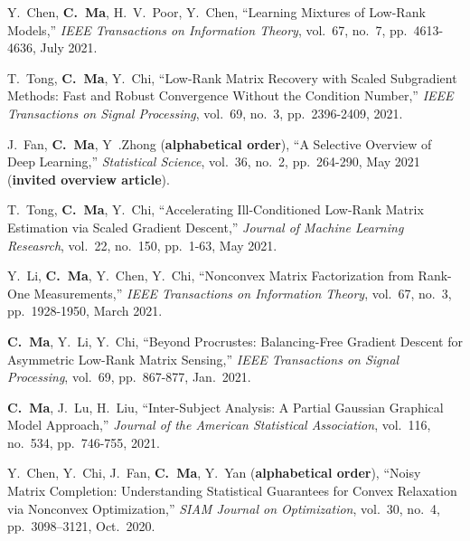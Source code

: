 \documentclass[a4paper, 10pt]{article}
\newenvironment{changemargin}[2]{%
  \begin{list}{}{%
    \setlength{\topsep}{0pt}%
    \setlength{\leftmargin}{#1}%
    \setlength{\rightmargin}{#2}%
    \setlength{\listparindent}{\parindent}%
    \setlength{\itemindent}{\parindent}%
    \setlength{\parsep}{\parskip}%
  }%
  \item[]}{\end{list}
}
\newenvironment{body} {
	\vspace*{-16pt}
	\begin{changemargin}{-0.3in}{-0.5in}
  }	
	{\end{changemargin}
}
\begin{document}
\begin{body}
\begin{enumerate}[label={[{J}{{\arabic*}}]}]
\item Y.~Chen, \textbf{C.~Ma}, H.~V.~Poor, Y.~Chen, {``Learning Mixtures of Low-Rank Models,''} \emph{IEEE Transactions on Information Theory}, vol.~67, no.~7, pp.~4613-4636, July 2021. \\






\item T.~Tong, \textbf{C.~Ma}, Y.~Chi, {``Low-Rank Matrix Recovery with Scaled Subgradient Methods: Fast and Robust Convergence Without the Condition Number,''}  \emph{IEEE Transactions on Signal Processing}, vol.~69, no.~3, pp.~2396-2409, 2021. \\







\item J.~Fan, \textbf{C.~Ma}, Y~.Zhong (\textbf{alphabetical order}), {``A Selective Overview of Deep Learning,''} \emph{Statistical Science}, vol.~36, no.~2, pp.~264-290, May 2021 (\textbf{invited overview article}).\\

\item T.~Tong, \textbf{C.~Ma}, Y.~Chi, {``Accelerating Ill-Conditioned Low-Rank Matrix Estimation via Scaled Gradient Descent,''} \emph{Journal of Machine Learning Reseasrch}, vol.~22, no.~150, pp.~1-63, May 2021. \\

\item Y.~Li, \textbf{C.~Ma}, Y.~Chen, Y.~Chi, {``Nonconvex Matrix Factorization from Rank-One Measurements,''} \emph{IEEE Transactions on Information Theory}, vol.~67, no.~3, pp.~1928-1950, March 2021.

\item \textbf{C.~Ma}, Y.~Li, Y.~Chi, {``Beyond Procrustes: Balancing-Free Gradient Descent for Asymmetric Low-Rank Matrix Sensing,''} \emph{IEEE Transactions on Signal Processing}, vol.~69, pp.~867-877, Jan.~2021.


	
\item	\textbf{C.~Ma}, J.~Lu, H.~Liu, {{``Inter-Subject Analysis: A Partial Gaussian Graphical Model Approach,''}}  \emph{Journal of the American Statistical Association}, vol.~116, no.~534, pp.~746-755, 2021. \\

\item Y.~Chen, Y.~Chi, J.~Fan, \textbf{C.~Ma}, Y.~Yan (\textbf{alphabetical order}), {``Noisy Matrix Completion: Understanding Statistical Guarantees for Convex Relaxation via Nonconvex Optimization,''} \emph{SIAM Journal on Optimization}, vol.~30, no.~4, pp.~3098–3121, Oct.~2020. \\


\end{enumerate}
\end{body}
\end{document}
